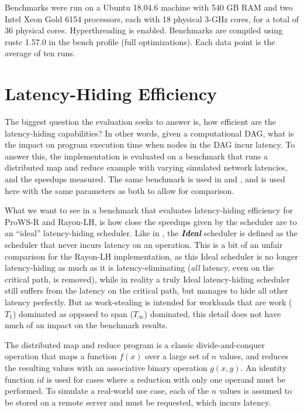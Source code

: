 \documentclass[bsc,frontabs,singlespacing,parskip,deptreport,normalheadings]{infthesis}
\begin{document}
Benchmarks were run on a Ubuntu 18.04.6 machine with 540 GB RAM and two Intel
Xeon Gold 6154 processors, each with 18 physical 3-GHz cores, for a total of 36
physical cores. Hyperthreading is enabled. Benchmarks are compiled using rustc
1.57.0 in the bench profile (full optimizations). Each data point is the average
of ten runs.

\section{Latency-Hiding Efficiency}
\label{section:latency-hiding_efficiency}

The biggest question the evaluation seeks to answer is, how efficient are the
latency-hiding capabilities? In other words, given a computational DAG, what is
the impact on program execution time when nodes in the DAG incur latency. To
answer this, the implementation is evaluated on a benchmark that runs a
distributed map and reduce example with varying simulated network latencies, and the
speedups measured. The same benchmark is used in
\cite{muller_latency-hiding_2016} and \cite{singer_scheduling_2019}, and is used
here with the same parameters as both to allow for comparison.

What we want to see in a benchmark that evaluates latency-hiding efficiency for
ProWS-R and Rayon-LH, is how close the speedups given by the scheduler are to an
``ideal'' latency-hiding scheduler. Like in \cite{singer_scheduling_2019}, the
\textit{\textbf{Ideal}} scheduler is defined as the scheduler that never incurs
latency on an operation. This is a bit of an unfair comparison for the Rayon-LH
implementation, as this Ideal scheduler is no longer latency-hiding as much as
it is latency-eliminating (\textit{all} latency, even on the critical path, is
removed), while in reality a truly Ideal latency-hiding scheduler still suffers
from the latency on the critical path, but manages to hide all other latency
perfectly. But as work-stealing is intended for workloads that are work
(\(T_1\)) dominated as opposed to span (\(T_\infty\)) dominated, this detail
does not have much of an impact on the benchmark results.

The distributed map and reduce program is a classic divide-and-conquer operation
that maps a function \(f(x)\) over a large set of \(n\) values, and reduces the
resulting values with an associative binary operation \(g(x,y)\). An identity
function \(id\) is used for cases where a reduction with only one operand must
be performed. To simulate a real-world use case, each of the \(n\) values is
assumed to be stored on a remote server and must be requested, which incurs
latency.
\end{document}
